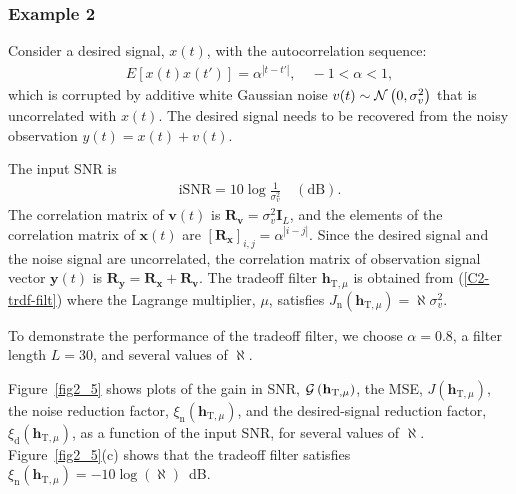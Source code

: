 \documentclass[10pt,pdflatex,headrule,landscape]{beamer}
\begin{document}
\begin{frame}
    \frametitle{Example 2}
Consider a desired signal, $x(t)$, with the autocorrelation sequence:
\begin{eqnarray*}
E\left[x(t) x(t')\right] = \alpha^{\left|t-t' \right|}, \quad -1<\alpha<1 ,
\end{eqnarray*}
which is corrupted by additive white Gaussian noise $v(t)\sim {\cal N}\left(0,\sigma_v^2\right)$ that is uncorrelated with $x(t)$.
The desired signal needs to be recovered from the noisy observation $y(t)=x(t)+v(t)$.

The input SNR is
\begin{eqnarray*}
\mathrm{iSNR} = 10\log\frac{1}{\sigma_v^2} \quad \mathrm{(dB)} .
\end{eqnarray*}
The correlation matrix of $\mathbf{v}(t)$ is $\mathbf{R}_{\mathbf{v}}=\sigma_v^2\mathbf{I}_L$, and the elements of the correlation matrix of $\mathbf{x}(t)$ are $\left[\mathbf{R}_{\mathbf{x}}\right]_{i,j}=\alpha^{\left|i-j \right|}$. Since the desired signal and the noise signal are uncorrelated, the correlation matrix of observation signal vector $\mathbf{y}(t)$ is $\mathbf{R}_{\mathbf{y}}=\mathbf{R}_{\mathbf{x}}+\mathbf{R}_{\mathbf{v}}$. The tradeoff filter $\mathbf{h}_{\mathrm{T},\mu}$ is obtained from (\ref{C2-trdf-filt}) where the Lagrange multiplier, $\mu$, satisfies $J_{\mathrm{n}}\left( \mathbf{h}_{\mathrm{T},\mu} \right) = \aleph \sigma_v^2$.

\end{frame}
\begin{frame}[allowframebreaks]


To demonstrate the performance of the tradeoff filter, we choose $\alpha=0.8$, a filter length $L=30$, and several values of $\aleph$.

Figure~\ref{fig2_5} shows plots of the gain in SNR, ${\cal G}\left(\mathbf{h}_{\mathrm{T},\mu}\right)$, the MSE, $J\left(\mathbf{h}_{\mathrm{T},\mu}\right)$, the noise reduction factor, $\xi_{\mathrm{n}}\left( \mathbf{h}_{\mathrm{T},\mu} \right)$, and
the desired-signal reduction factor, $\xi_{\mathrm{d}}\left( \mathbf{h}_{\mathrm{T},\mu} \right)$, as a function of the input SNR, for several values of $\aleph$. Figure~\ref{fig2_5}(c) shows that the tradeoff filter satisfies $\xi_{\mathrm{n}}\left( \mathbf{h}_{\mathrm{T},\mu} \right)=-10\log(\aleph)$~dB.

\end{frame}
\begin{frame}


\end{frame}
\end{document}
